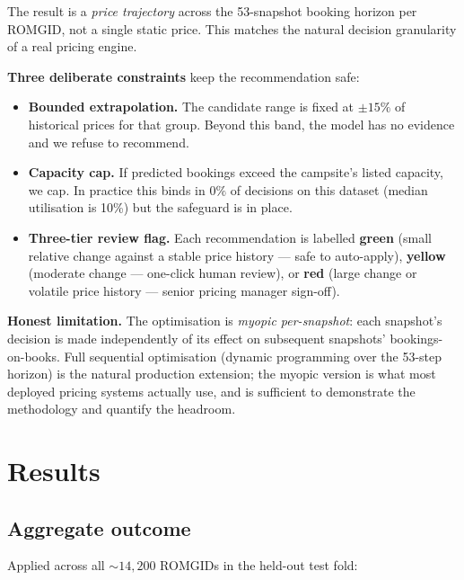 \documentclass[11pt,a4paper]{article}
\begin{document}
The result is a \emph{price trajectory} across the 53-snapshot booking horizon per ROMGID, not a single static price. This matches the natural decision granularity of a real pricing engine.

\textbf{Three deliberate constraints} keep the recommendation safe:

\begin{itemize}
  \item \textbf{Bounded extrapolation.} The candidate range is fixed at $\pm 15\%$ of historical prices for that group. Beyond this band, the model has no evidence and we refuse to recommend.
  \item \textbf{Capacity cap.} If predicted bookings exceed the campsite's listed capacity, we cap. In practice this binds in $0\%$ of decisions on this dataset (median utilisation is 10\%) but the safeguard is in place.
  \item \textbf{Three-tier review flag.} Each recommendation is labelled \textbf{green} (small relative change against a stable price history --- safe to auto-apply), \textbf{yellow} (moderate change --- one-click human review), or \textbf{red} (large change or volatile price history --- senior pricing manager sign-off).
\end{itemize}

\textbf{Honest limitation.} The optimisation is \emph{myopic per-snapshot}: each snapshot's decision is made independently of its effect on subsequent snapshots' bookings-on-books. Full sequential optimisation (dynamic programming over the 53-step horizon) is the natural production extension; the myopic version is what most deployed pricing systems actually use, and is sufficient to demonstrate the methodology and quantify the headroom.

\section{Results}

\subsection{Aggregate outcome}

Applied across all $\sim 14{,}200$ ROMGIDs in the held-out test fold:
\end{document}
